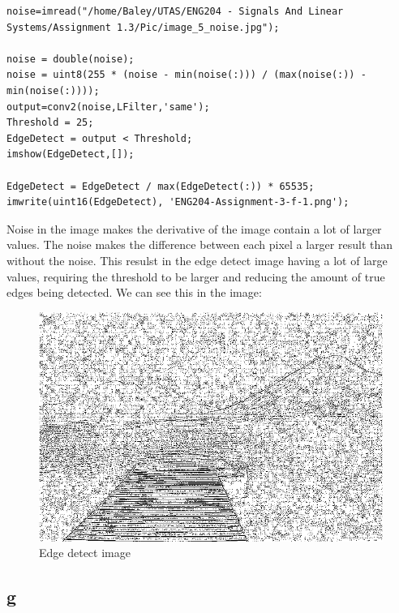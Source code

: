 \documentclass[11pt]{article}
\begin{document}
\begin{verbatim}
noise=imread("/home/Baley/UTAS/ENG204 - Signals And Linear Systems/Assignment 1.3/Pic/image_5_noise.jpg");

noise = double(noise);
noise = uint8(255 * (noise - min(noise(:))) / (max(noise(:)) - min(noise(:))));
output=conv2(noise,LFilter,'same');
Threshold = 25;
EdgeDetect = output < Threshold;
imshow(EdgeDetect,[]);

EdgeDetect = EdgeDetect / max(EdgeDetect(:)) * 65535;
imwrite(uint16(EdgeDetect), 'ENG204-Assignment-3-f-1.png');
\end{verbatim}
Noise in the image makes the derivative of the image contain a lot of larger values. The noise makes the difference between each pixel a larger result than without the noise. This resulst in the edge detect image having a lot of large values, requiring the threshold to be larger and reducing the amount of true edges being detected. We can see this in the image:
\begin{FIGURE}
\begin{figure}[htbp]
\centering
\includegraphics[width=.9\linewidth]{ENG204-Assignment-3-f-1.png}
\caption{Edge detect image}
\end{figure}
\end{FIGURE}
\subsection{g}
\label{sec:orgf04fce9}
\end{document}
